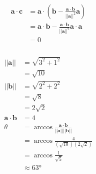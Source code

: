 \documentclass{article}
\begin{document}
\setcounter{subsubsection}{18}
\subsubsection{}

\begin{align*}
  \mathbf{a} \cdot \mathbf{c} & = \mathbf{a} \cdot \left( \mathbf{b} - \frac{\mathbf{a} \cdot \mathbf{b}}{||\mathbf{a}||^2} \mathbf{a} \right)   \\
                              & = \mathbf{a} \cdot \mathbf{b} - \frac{\mathbf{a} \cdot \mathbf{b}}{||\mathbf{a}||^2} \mathbf{a} \cdot \mathbf{a} \\
                              & = 0
\end{align*}

\setcounter{subsubsection}{20}
\subsubsection{}

\begin{align*}
  ||\mathbf{a}||              & = \sqrt{3^2 + 1^2}                                                          \\
                              & = \sqrt{10}                                                                 \\
  ||\mathbf{b}||              & = \sqrt{2^2 + 2^2}                                                          \\
                              & = \sqrt{8}                                                                  \\
                              & = 2 \sqrt{2}                                                                \\
  \mathbf{a} \cdot \mathbf{b} & = 4                                                                         \\
  \theta                      & = \arccos \frac{\mathbf{a} \cdot \mathbf{b}}{||\mathbf{a}|| ||\mathbf{b}||} \\
                              & = \arccos \frac{4}{(\sqrt{10}) (2 \sqrt{2})}                                \\
                              & = \arccos \frac{1}{\sqrt{5}}                                                \\
                              & \approx \ang{63}
\end{align*}
\end{document}
